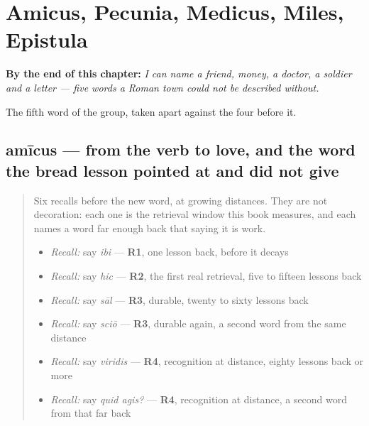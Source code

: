 
\chapter{Amicus, Pecunia, Medicus, Miles, Epistula}
\label{ch:la-urbani}

\begin{chapteropening}
\textbf{By the end of this chapter:} \emph{I can name a friend, money, a doctor, a soldier and a letter — five words a Roman town could not be described without.}

The fifth word of the group, taken apart against the four before it.
\end{chapteropening}

\section[amīcus, amīcī]{amīcus — from the verb to love, and the word the bread lesson pointed at and did not give}

\label{lesson:LA-C51-amicus}



\begin{quote}
Six recalls before the new word, at growing distances. They are not decoration: each one is the retrieval window this book measures, and each names a word far enough back that saying it is work.

\begin{itemize}
\raggedright
  \item \emph{Recall:} say \emph{ibi} — \textbf{R1}, one lesson back, before it decays
  \item \emph{Recall:} say \emph{hic} — \textbf{R2}, the first real retrieval, five to fifteen lessons back
  \item \emph{Recall:} say \emph{sāl} — \textbf{R3}, durable, twenty to sixty lessons back
  \item \emph{Recall:} say \emph{sciō} — \textbf{R3}, durable again, a second word from the same distance
  \item \emph{Recall:} say \emph{viridis} — \textbf{R4}, recognition at distance, eighty lessons back or more
  \item \emph{Recall:} say \emph{quid agis?} — \textbf{R4}, recognition at distance, a second word from that far back
\end{itemize}
\end{quote}

